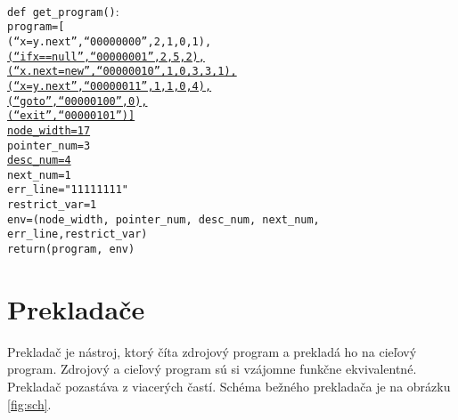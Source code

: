 \texttt{
\\
def get\_program()$\colon$\\
\tab program=[\\
\tab \tab (``x=y.next'',``00000000'',2,1,0,1),\\
\underline{\tab \tab (``ifx==null'',``00000001'',2,5,2),}\\
\underline{\tab \tab (``x.next=new'',``00000010'',1,0,3,3,1),}\\
\underline{\tab \tab (``x=y.next'',``00000011'',1,1,0,4),}\\
\underline{\tab \tab (``goto'',``00000100'',0),}\\
\underline{\tab \tab (``exit'',``00000101'')]}\\
\underline{\tab node\_width=17}\\
\tab pointer\_num=3\\
\underline{\tab desc\_num=4}\\
\tab next\_num=1\\
\tab err\_line="11111111"\\
\tab restrict\_var=1\\
\tab env=(node\_width, pointer\_num, desc\_num, next\_num, err\_line,restrict\_var)\\
\tab return(program, env)
}

\chapter{Prekladače}
\label{kap_prekladace}
Prekladač je nástroj, ktorý číta zdrojový program a prekladá ho na cieľový program.
Zdrojový a cieľový program sú si vzájomne funkčne ekvivalentné\cite{meduna}.
Prekladač pozastáva z viacerých častí. Schéma bežného prekladača je na obrázku \ref{fig:sch}.


